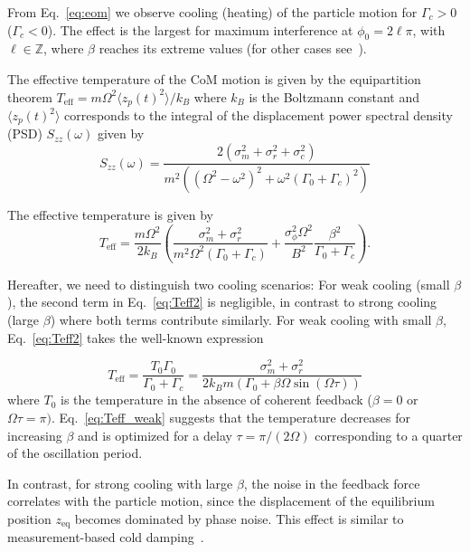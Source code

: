 \documentclass[reprint,aps,prl,superscriptaddress]{revtex4-2}
\begin{document}
From Eq.~\ref{eq:eom} we observe cooling (heating) of the particle motion for $\Gamma_c>0$ ($\Gamma_c<0$). The effect is the largest for maximum interference at $\phi_0=2\ell\pi$, with $\ell\in\mathbb{Z}$, where $\beta$ reaches its extreme values (for other cases see~\cite{SM}).


The effective temperature of the CoM motion is given by the equipartition theorem $T_\text{eff}= m\Omega^2 \langle z_p(t)^2\rangle/ k_B$ where $k_B$ is the Boltzmann constant and  $\langle z_p(t)^2\rangle$ corresponds to the integral of the displacement power spectral density (PSD) $S_{zz}(\omega)$ given by 
\begin{equation}
    S_{zz}(\omega) = \frac{2(\sigma_m^2 + \sigma_r^2 + \sigma_c^2)}{m^2((\Omega^2 - \omega^2)^2 + \omega^2 (\Gamma_0+\Gamma_c)^2)}
\end{equation}

The effective temperature is given by 
\begin{equation}\label{eq:Teff2}
    T_\text{eff}= \frac{m\Omega^2}{2k_B} \left( \frac{\sigma_m^2 + \sigma_r^2}{m^2 \Omega^2(\Gamma_0 + \Gamma_c)} + \frac{\sigma_\phi^2\Omega^2}{B^2}\frac{\beta^2}{\Gamma_0 + \Gamma_c} \right).
\end{equation}

Hereafter, we need to distinguish two cooling scenarios: For weak cooling (small $\beta$), the second term in Eq.~\ref{eq:Teff2} is negligible, in contrast to strong cooling (large $\beta$) where both terms contribute similarly. For weak cooling with small $\beta$, Eq.~\ref{eq:Teff2} takes the well-known expression~\cite{gieseler2012subkelvin}

\begin{equation}\label{eq:Teff_weak}
       T_\text{eff} =  \frac{T_0 \Gamma_0}{\Gamma_0 + \Gamma_c}  = \frac{\sigma_m^2 + \sigma_r^2}{2k_B m (\Gamma_0 +\beta\Omega\sin(\Omega\tau))} 
\end{equation}
where $T_0$ is the temperature in the absence of coherent feedback ($\beta =0$ or $\Omega\tau= \pi)$. %
Eq.~\ref{eq:Teff_weak} suggests that the temperature decreases for increasing $\beta$ and is optimized for a delay $\tau= \pi/(2\Omega)$ corresponding to a quarter of the oscillation period.

In contrast, for strong cooling with large $\beta$, the noise in the feedback force correlates with the particle motion, since the displacement of the equilibrium position $z_\text{eq}$ becomes dominated by phase noise. This effect is similar to measurement-based cold damping~\cite{conangla2019optimal}. 
\end{document}
